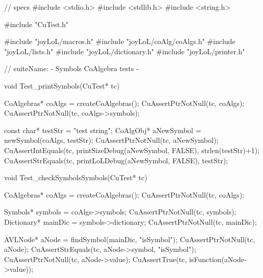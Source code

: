 \starttyping
// specs
#include <stdio.h>
#include <stdlib.h>
#include <string.h>

#include "CuTest.h"

#include "joyLoL/macros.h"
#include "joyLoL/coAlg/coAlgs.h"
#include "joyLoL/lists.h"
#include "joyLoL/dictionary.h"
#include "joyLoL/printer.h"

// suiteName: - Symbols CoAlgebra tests -


void Test_printSymbols(CuTest* tc) {
  CoAlgebras* coAlgs = createCoAlgebras();
  CuAssertPtrNotNull(tc, coAlgs);
  CuAssertPtrNotNull(tc, coAlgs->symbols);

  const char* testStr = "test string";
  CoAlgObj* aNewSymbol = newSymbol(coAlgs, testStr);
  CuAssertPtrNotNull(tc, aNewSymbol);
  CuAssertIntEquals(tc, printSizeDebug(aNewSymbol, FALSE), strlen(testStr)+1);
  CuAssertStrEquals(tc, printLoLDebug(aNewSymbol, FALSE), testStr);
}

void Test_checkSymbolsSymbols(CuTest* tc) {
  CoAlgebras* coAlgs = createCoAlgebras();
  CuAssertPtrNotNull(tc, coAlgs);

  Symbols* symbols = coAlgs->symbols;
  CuAssertPtrNotNull(tc, symbols);
  Dictionary* mainDic = symbols->dictionary;
  CuAssertPtrNotNull(tc, mainDic);

  AVLNode* aNode = findSymbol(mainDic, "isSymbol");
  CuAssertPtrNotNull(tc, aNode);
  CuAssertStrEquals(tc, aNode->symbol, "isSymbol");
  CuAssertPtrNotNull(tc, aNode->value);
  CuAssertTrue(tc, isFunction(aNode->value));
}
\stoptyping